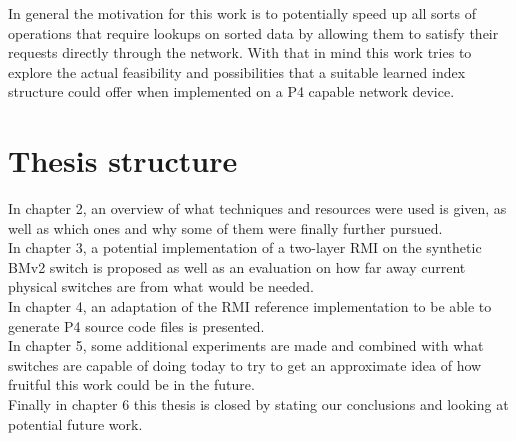 In general the motivation for this work is to potentially speed up all sorts of operations that require lookups on sorted data by allowing them to satisfy their requests directly through the network. With that in mind this work tries to explore the actual feasibility and possibilities that a suitable learned index structure could offer when implemented on a P4 capable network device.\pagebreak

\section{Thesis structure}
In chapter 2, an overview of what techniques and resources were used is given, as well as which ones and why some of them were finally further pursued.\\

\noindent
In chapter 3, a potential implementation of a two-layer RMI on the synthetic BMv2 switch is proposed as well as an evaluation on how far away current physical switches are from what would be needed.\\

\noindent
In chapter 4, an adaptation of the RMI reference implementation \cite{cdfshop} to be able to generate P4 source code files is presented.\\

\noindent
In chapter 5, some additional experiments are made and combined with what switches are capable of doing today to try to get an approximate idea of how fruitful this work could be in the future.\\

\noindent
Finally in chapter 6 this thesis is closed by stating our conclusions and looking at potential future work.
